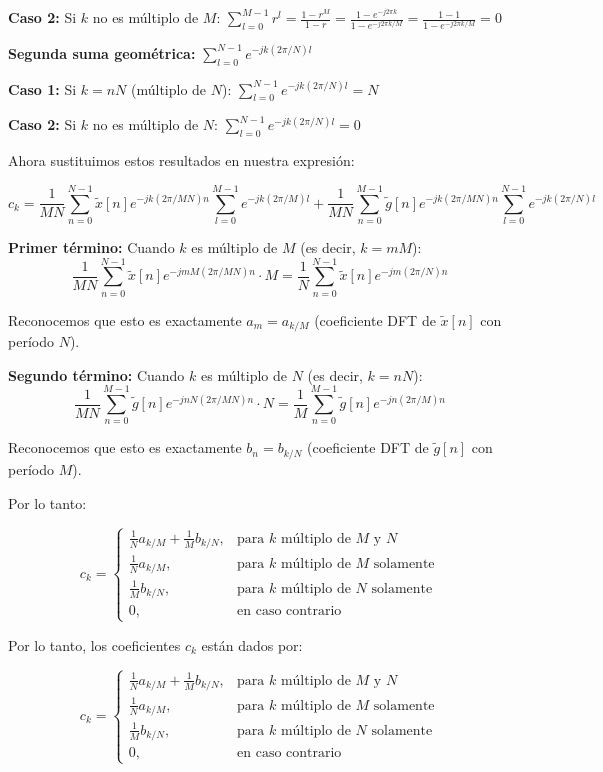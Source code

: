 \documentclass[
  11pt,
  letterpaper,
   addpoints,
   answers
  ]{exam}
\begin{document}
\begin{questions}
\begin{solution}
\textbf{Caso 2:} Si $k$ no es múltiplo de $M$: $\sum_{l=0}^{M-1} r^l = \frac{1-r^M}{1-r} = \frac{1-e^{-j2\pi k}}{1-e^{-j2\pi k/M}} = \frac{1-1}{1-e^{-j2\pi k/M}} = 0$

\textbf{Segunda suma geométrica:} $\sum_{l=0}^{N-1} e^{-jk(2\pi/N)l}$

\textbf{Caso 1:} Si $k = nN$ (múltiplo de $N$): $\sum_{l=0}^{N-1} e^{-jk(2\pi/N)l} = N$

\textbf{Caso 2:} Si $k$ no es múltiplo de $N$: $\sum_{l=0}^{N-1} e^{-jk(2\pi/N)l} = 0$


Ahora sustituimos estos resultados en nuestra expresión:

$$c_k = \frac{1}{MN} \sum_{n=0}^{N-1} \tilde{x}[n] e^{-jk(2\pi/MN)n} \sum_{l=0}^{M-1} e^{-jk(2\pi/M)l} + \frac{1}{MN} \sum_{n=0}^{M-1} \tilde{g}[n] e^{-jk(2\pi/MN)n} \sum_{l=0}^{N-1} e^{-jk(2\pi/N)l}$$


\textbf{Primer término:} Cuando $k$ es múltiplo de $M$ (es decir, $k = mM$):
$$\frac{1}{MN} \sum_{n=0}^{N-1} \tilde{x}[n] e^{-jmM(2\pi/MN)n} \cdot M = \frac{1}{N} \sum_{n=0}^{N-1} \tilde{x}[n] e^{-jm(2\pi/N)n}$$

Reconocemos que esto es exactamente $a_m = a_{k/M}$ (coeficiente DFT de $\tilde{x}[n]$ con período $N$).

\textbf{Segundo término:} Cuando $k$ es múltiplo de $N$ (es decir, $k = nN$):
$$\frac{1}{MN} \sum_{n=0}^{M-1} \tilde{g}[n] e^{-jnN(2\pi/MN)n} \cdot N = \frac{1}{M} \sum_{n=0}^{M-1} \tilde{g}[n] e^{-jn(2\pi/M)n}$$

Reconocemos que esto es exactamente $b_n = b_{k/N}$ (coeficiente DFT de $\tilde{g}[n]$ con período $M$).

Por lo tanto:

$$c_k = \begin{cases}
\frac{1}{N} a_{k/M} + \frac{1}{M} b_{k/N}, & \text{para } k \text{ múltiplo de } M \text{ y } N \\[0.3em]
\frac{1}{N} a_{k/M}, & \text{para } k \text{ múltiplo de } M \text{ solamente} \\[0.3em]
\frac{1}{M} b_{k/N}, & \text{para } k \text{ múltiplo de } N \text{ solamente} \\[0.3em]
0, & \text{en caso contrario}
\end{cases}$$

Por lo tanto, los coeficientes $c_k$ están dados por:

$$c_k = \begin{cases}
\frac{1}{N} a_{k/M} + \frac{1}{M} b_{k/N}, & \text{para } k \text{ múltiplo de } M \text{ y } N \\
\frac{1}{N} a_{k/M}, & \text{para } k \text{ múltiplo de } M \text{ solamente} \\
\frac{1}{M} b_{k/N}, & \text{para } k \text{ múltiplo de } N \text{ solamente} \\
0, & \text{en caso contrario}
\end{cases}$$


\end{solution}
\end{questions}
\end{document}
